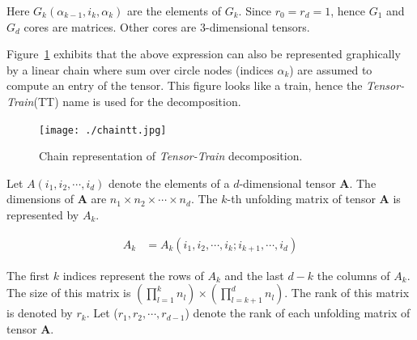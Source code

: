 \documentclass[runningheads]{llncs}
\newcommand{\tensor}[1]{\cal\textbf{#1}\xspace}
\newcommand{\ttrain}{{\it Tensor-Train}\xspace}
\begin{document}
\noindent Here $G_k(\alpha_{k-1}, i_k, \alpha_k)$ are the elements of $G_k$. Since $r_0=r_d=1$, hence $G_1$ and $G_d$ cores are matrices. Other cores are $3$-dimensional tensors.

\noindent Figure~\ref{fig:ttrainchain} exhibits that the above expression can also be represented graphically by a linear chain where sum over circle nodes (indices $\alpha_k$) are assumed to compute an entry of the tensor. This figure looks like a train, hence the \ttrain (TT) name is used for the decomposition. 

\begin{figure}[htb]
	\begin{center}
		\texttt{[image: ./chaintt.jpg]}
		\caption{Chain representation of \ttrain decomposition.\label{fig:ttrainchain}}
	\end{center}
\end{figure}


Let $A(i_1,i_2,\cdots, i_d)$ denote the elements of a $d$-dimensional tensor \tensor{A}. The dimensions of \tensor{A} are $n_1 \times n_2 \times \cdots \times n_d$. The $k$-th unfolding matrix of tensor \tensor{A} is represented by $A_k$.

\begin{align*}
A_k &= A_k(i_1, i_2,\cdots, i_k; i_{k+1},\cdots ,i_d)
\end{align*}

\noindent The first $k$ indices represent the rows of $A_k$ and the last $d-k$ the columns of $A_k$. The size of this matrix is $(\prod_{l=1}^{k}n_l)\times(\prod_{l=k+1}^{d}n_l)$. The rank of this matrix is denoted by $r_k$. Let ($r_1, r_2,\cdots, r_{d-1}$)  denote the rank of each unfolding matrix of tensor \tensor{A}.

\end{document}

